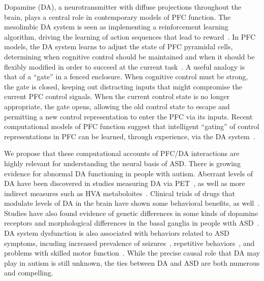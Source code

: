 Dopamine (DA), a neurotransmitter with diffuse projections throughout the brain, plays a central role in contemporary models of PFC function. The mesolimbic DA system is seen as implementing a reinforcement learning algorithm, driving the learning of action sequences that lead to reward~\cite{MontaguePR:1996:Dopamine,BartoAG:1994:TDLearning}. In PFC models, the DA system learns to adjust the state of PFC pyramidal cells, determining when cognitive control should be maintained and when it should be flexibly modified in order to succeed at the current task~\cite{BraverTS:2000:Control,RougierNP:2005:XT}. A useful analogy is that of a ``gate'' in a fenced enclosure. When cognitive control must be strong, the gate is closed, keeping out distracting inputs that might compromise the current PFC control signals. When the current control state is no longer appropriate, the gate opens, allowing the old control state to escape and permitting a new control representation to enter the PFC via its inputs.  Recent computational models of PFC function suggest that intelligent ``gating'' of control representations in PFC can be learned, through experience, via the DA system~\cite{RougierNP:2005:XT,RougierNP:2002:TaskSwitching}. 

We propose that these computational accounts of PFC/DA interactions are highly relevant for understanding the neural basis of ASD. There is growing evidence for abnormal DA functioning in people with autism. Aberrant levels of DA have been discovered in studies measuring DA via PET~\cite{FernellE:1997:AutismPET}, as well as more indirect measures such as HVA metaboloites~\cite{MartineauJ:1992:AutismDopamine}. Clinical trials of drugs that modulate levels of DA in the brain have shown some behavioral benefits, as well~\cite{PoseyDJ:2000:AutismDopamine,TsaiLY:1999:AutismDopamine}. Studies have also found evidence of genetic differences in some kinds of dopamine receptors and morphological differences in the basal ganglia in people with ASD~\cite{deJongeM:2012:DopamineASDGenetics,MostofskySH:2010:BasalGangliaASDMotor}. DA system dysfunction is also associated with behaviors related to ASD symptoms, incuding increased prevalence of seizures~\cite{StarrMS:1996:SeizuresDA,TuchmanR:2002:EpilepsyAutism}, repetitive behaviors~\cite{CanalesJJ:2000:Stereotypy,RalphRJ:2001:Perseveration,Ralph-WilliansRJ:2003:HyperactiveDA}, and problems with skilled motor function~\cite{RinehartNJ:2001:AutismMovement,RinehartNJ:2006:AutismGait}.
While the precise causal role that DA may play in autism is still unknown, the ties between DA and ASD are both numerous and compelling.

